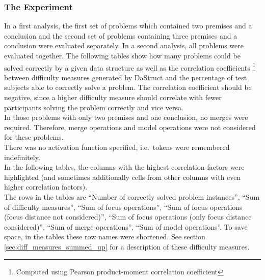 \documentclass[hidelinks]{scrartcl}
\begin{document}
\subsubsection{The Experiment}
In a first analysis, the first set of problems which contained two \gls{premise}s and a conclusion and the second set of problems containing three \gls{premise}s and a conclusion were evaluated separately. In a second analysis, all problems were evaluated together. The following tables show how many problems could be solved correctly by a given data structure as well as the correlation coefficients \footnote{Computed using Pearson product-moment correlation coefficient} between difficulty measures generated by DaStruct and the percentage of test subjects able to correctly solve a problem. The correlation coefficient should be negative, since a higher difficulty measure should correlate with fewer participants solving the problem correctly and vice versa. \\
In those problems with only two \gls{premise}s and one conclusion, no merges were required. Therefore, merge operations and model operations were not considered for these problems. \\
There was no activation function specified, i.e.\ \gls{token}s were remembered indefinitely. \\
In the following tables, the columns with the highest correlation factors were highlighted (and sometimes additionally cells from other columns with even higher correlation factors).\\
The rows in the tables are ``Number of correctly solved problem instances'', ``Sum of difficulty measures'', ``Sum of focus operations'', ``Sum of focus operations (focus distance not considered)'', ``Sum of focus operations (only focus distance considered)'', ``Sum of merge operations'', ``Sum of model operations''. To save space, in the tables these row names were shortened. See section \ref{sec:diff_measures_summed_up} for a description of these difficulty measures.
\end{document}
